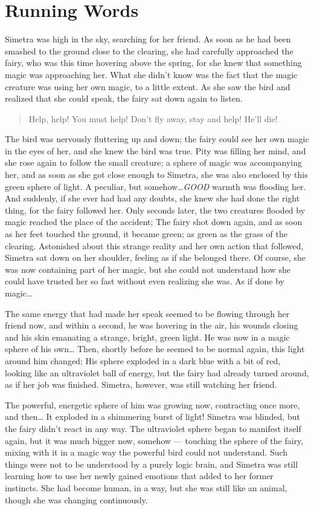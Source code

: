 \chapter{Running Words}
\label{cha:running-words}
Simetra was high in the sky, searching for her friend. As soon as he had been smashed to the ground close to the clearing, she had carefully approached the fairy, who was this time hovering above the spring, for she knew that something magic was approaching her. What she didn't know was the fact that the magic creature was using her own magic, to a little extent. As she saw the bird and realized that she could speak, the fairy sat down again to listen.
\begin{quote}
Help, help! You must help! Don't fly away, stay and help! He'll die!  
\end{quote}
The bird was nervously fluttering up and down; the fairy could see her own magic in the eyes of her, and she knew the bird was true.
Pity was filling her mind, and she rose again to follow the small creature; a sphere of magic was accompanying her, and as soon as she got close enough to Simetra,
she was also enclosed by this green sphere of light. A peculiar, but somehow\dots \emph{GOOD} warmth was flooding her. And suddenly, if she ever had had any doubts, she knew she had done the right thing, for the fairy followed her. Only seconds later, the two creatures flooded by magic reached the place of the accident; The fairy shot down again, and as soon as her feet touched the ground, it became green; as green as the grass of the clearing. Astonished about this strange reality and her own action that followed, Simetra sat down on her shoulder, feeling as if she belonged there. Of course, she was now containing part of her magic, but she could not understand how she could have trusted her so fast without even realizing she was. As if done by magic\dots

The same energy that had made her speak seemed to be flowing through her friend now, and within a second, he was hovering in the air, his wounds closing and his skin emanating a strange, bright, green light. He was now in a magic sphere of his own\dots
Then, shortly before he seemed to be normal again, this light around him changed; His sphere exploded in a dark blue with a bit of red, looking like an ultraviolet ball of energy, but the fairy had already turned around, as if her job was finished. Simetra, however, was still watching her friend.

The powerful, energetic sphere of him was growing now, contracting once more, and then\dots
It exploded in a shimmering burst of light! 
Simetra was blinded, but the fairy didn't react in any way. The ultraviolet sphere began to manifest itself again, but it was much bigger now, somehow --- touching the sphere of the fairy, mixing with it in a magic way the powerful bird could not understand. Such things were not to be understood by a purely logic brain, and Simetra was still learning how to use her newly gained emotions that added to her former instincts. She had become human, in a way, but she was still like an animal, though she was changing continuously.

